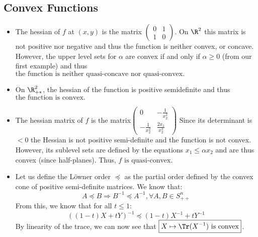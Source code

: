 \documentclass[math, info]{cours}
\begin{document}
\subsection*{Convex Functions}
\begin{itemize}
	\item The hessian of $f$ at $(x,y)$ is the matrix $\begin{pmatrix}
			0 & 1\\
			1 & 0
		\end{pmatrix}$.
		On $\R^{2}$ this matrix is not positive nor negative and thus the function is neither convex, or concave.
However, the upper level sets for $\alpha$ are convex if and only if $\alpha \geq 0$ (from our first example) and thus $\boxed{\text{the function is neither quasi-concave nor quasi-convex.}}$
	\item On $\R_{+*}^{2}$, the hessian of the function is positive semidefinite and thus $\boxed{\text{the function is convex.}}$
	\item The hessian matrix of $f$ is the matrix$\begin{pmatrix}
			0 & -\frac{1}{x_{2}^{2}}\\
			-\frac{1}{x_{2}^{2}} & \frac{2x_{1}}{x_{2}^{3}}
		\end{pmatrix}$
		Since its determinant is $<0$ the Hessian is not positive semi-definite and the function is not convex.
		However, its sublevel sets are defined by the equations $x_{1} \leq \alpha x_{2}$ and are thus convex (since half-planes).
		Thus, $\boxed{f \text{ is quasi-convex}}$.
	\item Let us define the Löwner order $\preceq$ as the partial order defined by the convex cone of positive semi-definite matrices.
		We know that:
		\begin{equation*}
			A \preceq B \Rightarrow B^{-1} \preceq A^{-1}, \forall A, B \in S_{++}^{n}
		\end{equation*}
		From this, we know that for all $t \leq 1$:
		\begin{equation*}
			\left( \left( 1 - t \right) X + tY \right)^{-1} \preceq \left( 1 - t \right)X^{-1} + tY^{-1}
		\end{equation*}
		By linearity of the trace, we can now see that $\boxed{X \mapsto \Tr(X^{-1}) \text{ is convex}}$.
\end{itemize}
\end{document}
